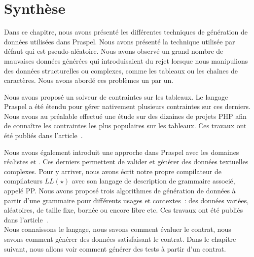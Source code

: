 \section{Synthèse}
\label{section:data:summary}

Dans ce chapitre, nous avons présenté les différentes techniques de génération
de données utilisées dans Praspel. Nous avons présenté la technique utilisée par
défaut qui est pseudo-aléatoire. Nous avons observé un grand nombre de mauvaises
données générées qui introduisaient du rejet lorsque nous manipulions des
données structurelles ou complexes, comme les tableaux ou les chaînes de
caractères. Nous avons abordé ces problèmes un par un.

Nous avons proposé un solveur de contraintes sur les tableaux. Le langage
Praspel a été étendu pour gérer nativement plusieurs contraintes sur ces
derniers. Nous avons au préalable effectué une étude sur des dizaines de projets
PHP afin de connaître les contraintes les plus populaires sur les tableaux. Ces
travaux ont été publiés dans l'article~.

Nous avons également introduit une approche 
dans Praspel avec les domaines réalistes  et . Ces
derniers permettent de valider et générer des données textuelles complexes.
Pour y arriver, nous avons écrit notre propre compilateur de compilateurs
$LL(\star)$ avec son langage de description de grammaire associé, appelé PP.
Nous avons proposé trois algorithmes de génération de données à partir d'une
grammaire pour différents usages et contextes~: des données variées, aléatoires,
de taille fixe, bornée ou encore libre etc. Ces travaux ont été publiés dans
l'article~. \\

Nous connaissons le langage, nous savons comment évaluer le contrat, nous savons
comment générer des données satisfaisant le contrat. Dans le chapitre suivant,
nous allons voir comment générer des tests à partir d'un contrat.
